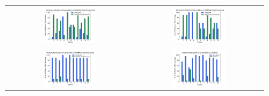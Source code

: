 



\begin{figure}[!t]
\centering
\begin{minipage}{0.86\textwidth}
\begin{tabular}{@{}c@{}c@{}}
\includegraphics[width=0.43\textwidth]{submissions/Ali2023/figures/q2b_r1.png} & 
\includegraphics[width=0.43\textwidth]{submissions/Ali2023/figures/q2b_r2.png} \\
\includegraphics[width=0.43\textwidth]{submissions/Ali2023/figures/q2b_r3.png} &
\includegraphics[width=0.43\textwidth]{submissions/Ali2023/figures/q2b_distmult.png}

\end{tabular}
\end{minipage}
\end{figure}
